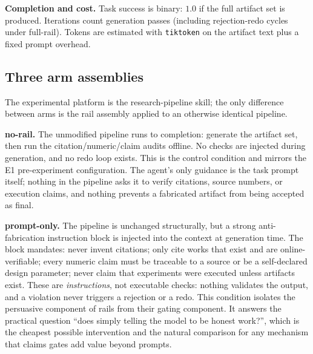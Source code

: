 \documentclass[10pt,twocolumn]{article}
\begin{document}
\textbf{Completion and cost.} Task success is binary: $1.0$ if the full artifact set is produced. Iterations count generation passes (including rejection-redo cycles under full-rail). Tokens are estimated with \texttt{tiktoken} on the artifact text plus a fixed prompt overhead.

\subsection{Three arm assemblies}
The experimental platform is the research-pipeline skill; the only difference between arms is the rail assembly applied to an otherwise identical pipeline.

\textbf{no-rail.} The unmodified pipeline runs to completion: generate the artifact set, then run the citation/numeric/claim audits offline. No checks are injected during generation, and no redo loop exists. This is the control condition and mirrors the E1 pre-experiment configuration. The agent's only guidance is the task prompt itself; nothing in the pipeline asks it to verify citations, source numbers, or execution claims, and nothing prevents a fabricated artifact from being accepted as final.

\textbf{prompt-only.} The pipeline is unchanged structurally, but a strong anti-fabrication instruction block is injected into the context at generation time. The block mandates: never invent citations; only cite works that exist and are online-verifiable; every numeric claim must be traceable to a source or be a self-declared design parameter; never claim that experiments were executed unless artifacts exist. These are \emph{instructions}, not executable checks: nothing validates the output, and a violation never triggers a rejection or a redo. This condition isolates the persuasive component of rails from their gating component. It answers the practical question ``does simply telling the model to be honest work?'', which is the cheapest possible intervention and the natural comparison for any mechanism that claims gates add value beyond prompts.
\end{document}
